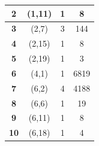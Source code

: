 \begin{table}
\begin{tabular}{cccc}
\textbf{2}              & (1,11)                                                                     & 1                                                                           & 8                                                                              \\ \hline
\textbf{3}              & (2,7)                                                                      & 3                                                                           & 144                                                                            \\ \hline
\textbf{4}              & (2,15)                                                                     & 1                                                                           & 8                                                                              \\ \hline
\textbf{5}              & (2,19)                                                                     & 1                                                                           & 3                                                                              \\ \hline
\textbf{6}              & (4,1)                                                                      & 1                                                                           & 6819                                                                           \\ \hline
\textbf{7}              & (6,2)                                                                      & 4                                                                           & 4188                                                                           \\ \hline
\textbf{8}              & (6,6)                                                                      & 1                                                                           & 19                                                                             \\ \hline
\textbf{9}              & (6,11)                                                                     & 1                                                                           & 8                                                                              \\ \hline
\textbf{10}             & (6,18)                                                                     & 1                                                                           & 4                                                                              \\ \hline\midrule
\end{tabular}
\end{table}




